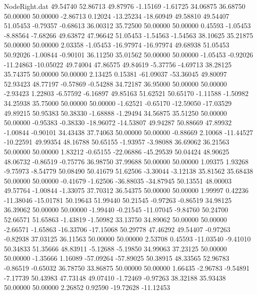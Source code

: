 \begin{filecontents}{NodeRight.dat}
  49.54740   52.86713   49.87976    -1.15169   -1.61725   34.06875   36.68750   50.00000   50.00000   -2.86713    0.12024  -13.25234  -18.60949
  49.58810   49.54407   51.05453    -0.79357   -0.68613   36.00312   35.72500   50.00000   50.00000    0.45593   -1.05453   -8.88564   -7.68266
  49.63872   47.96642   51.05453    -1.54563   -1.54563   38.10625   35.21875   50.00000   50.00000    2.03358   -1.05453  -16.97974  -16.97974
  49.68938   51.05453   50.92026    -1.00844   -0.90101   36.11250   35.01562   50.00000   50.00000   -1.05453   -0.92026  -11.24863  -10.05022
  49.74004   47.86575   49.84619    -5.37756   -4.69713   38.28125   35.74375   50.00000   50.00000    2.13425    0.15381  -61.09037  -53.36045
  49.80097   52.93423   48.77197    -0.57869   -0.54288   34.72187   36.95000   50.00000   50.00000   -2.93423    1.22803   -6.57592   -6.16897
  49.85163   51.62521   50.65170    -1.11588   -1.50982   34.25938   35.75000   50.00000   50.00000   -1.62521   -0.65170  -12.59050  -17.03529
  49.89215   50.95383   50.38330    -1.68888   -1.29494   34.56875   35.51250   50.00000   50.00000   -0.95383   -0.38330  -18.96072  -14.53807
  49.94287   50.88669   47.89932    -1.00844   -0.90101   34.43438   37.74063   50.00000   50.00000   -0.88669    2.10068  -11.44527  -10.22591
  49.99354   48.16788   50.65155    -1.93957   -3.98088   36.69062   36.21563   50.00000   50.00000    1.83212   -0.65155  -22.06886  -45.29539
  50.04424   48.90625   48.06732    -0.86519   -0.75776   36.98750   37.99688   50.00000   50.00000    1.09375    1.93268   -9.75973   -8.54779
  50.08490   50.41679   51.62506    -3.30044   -3.12138   35.81562   35.68438   50.00000   50.00000   -0.41679   -1.62506  -36.88035  -34.87945
  50.13551   48.00003   49.57764    -1.00844   -1.33075   37.70312   36.54375   50.00000   50.00000    1.99997    0.42236  -11.38046  -15.01781
  50.19643   51.99440   50.21545    -0.97263   -0.86519   34.98125   36.39062   50.00000   50.00000   -1.99440   -0.21545  -11.07045   -9.84760
  50.24700   52.66571   51.65863    -1.43819   -1.50982   33.13750   34.89062   50.00000   50.00000   -2.66571   -1.65863  -16.33706  -17.15068
  50.29778   47.46292   49.54407    -0.97263   -0.82938   37.03125   36.11563   50.00000   50.00000    2.53708    0.45593  -11.03540   -9.41010
  50.34833   51.35666   48.83911    -5.12688   -5.19850   34.99063   37.23125   50.00000   50.00000   -1.35666    1.16089  -57.09264  -57.89025
  50.38915   48.33565   52.96783    -0.86519   -0.65032   36.78750   33.86875   50.00000   50.00000    1.66435   -2.96783   -9.54891   -7.17739
  50.43983   47.73148   49.07410    -1.72469   -0.97263   38.32188   35.93438   50.00000   50.00000    2.26852    0.92590  -19.72628  -11.12453

\end{filecontents}
